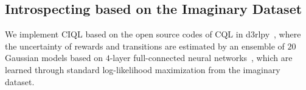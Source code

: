 


\subsection{Introspecting based on the Imaginary Dataset}

We implement CIQL based on the open source codes of CQL in d3rlpy~\citep{d3rlpy}, where the uncertainty of rewards and transitions are estimated by an ensemble of $20$ Gaussian models based on $4$-layer full-connected neural networks~\citep{mopo@2020tianhe,maple@2023xionghui}, which are learned through standard log-likelihood maximization from the imaginary dataset. 







